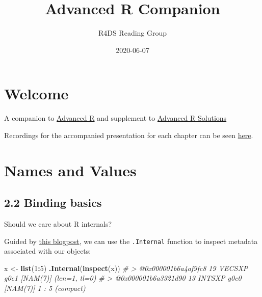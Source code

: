 \documentclass[]{book}
\title{Advanced R Companion}
\author{R4DS Reading Group}
\date{2020-06-07}
\newenvironment{Shaded}{\begin{snugshade}}{\end{snugshade}}
\newcommand{\CommentTok}[1]{\textcolor[rgb]{0.56,0.35,0.01}{\textit{#1}}}
\newcommand{\DecValTok}[1]{\textcolor[rgb]{0.00,0.00,0.81}{#1}}
\newcommand{\KeywordTok}[1]{\textcolor[rgb]{0.13,0.29,0.53}{\textbf{#1}}}
\newcommand{\NormalTok}[1]{#1}
\newcommand{\OperatorTok}[1]{\textcolor[rgb]{0.81,0.36,0.00}{\textbf{#1}}}
\newcommand{\StringTok}[1]{\textcolor[rgb]{0.31,0.60,0.02}{#1}}
\begin{document}
\maketitle

{
\setcounter{tocdepth}{1}
\tableofcontents
}
\hypertarget{welcome}{%
\chapter{Welcome}\label{welcome}}

A companion to \href{https://adv-r.hadley.nz/rcpp.html\#acknowledgments}{Advanced R} and supplement to \href{https://advanced-r-solutions.rbind.io/names-and-values.html\#copy-on-modify}{Advanced R Solutions}

Recordings for the accompanied presentation for each chapter can be seen \href{https://www.youtube.com/watch?v=pQ-xDAPEQaw\&list=PL3x6DOfs2NGi9lH7q-phZlPrl6HKXYDbn}{here}.

\hypertarget{names-and-values}{%
\chapter{Names and Values}\label{names-and-values}}

\hypertarget{binding-basics}{%
\section*{2.2 Binding basics}\label{binding-basics}}

Should we care about R internals?

Guided by \href{https://www.brodieg.com/2019/02/18/an-unofficial-reference-for-internal-inspect/}{this blogpost}, we can use the \texttt{.Internal} function to inspect metadata associated with our objects:

\begin{Shaded}
\begin{Highlighting}[]
\NormalTok{ x <-}\StringTok{ }\KeywordTok{list}\NormalTok{(}\DecValTok{1}\OperatorTok{:}\DecValTok{5}\NormalTok{)}
\KeywordTok{.Internal}\NormalTok{(}\KeywordTok{inspect}\NormalTok{(x))}
\CommentTok{# > @0x000001b6a4af9fc8 19 VECSXP g0c1 [NAM(7)] (len=1, tl=0)}
\CommentTok{# > @0x000001b6a3321d90 13 INTSXP g0c0 [NAM(7)]  1 : 5 (compact)}
\end{Highlighting}
\end{Shaded}
\end{document}
